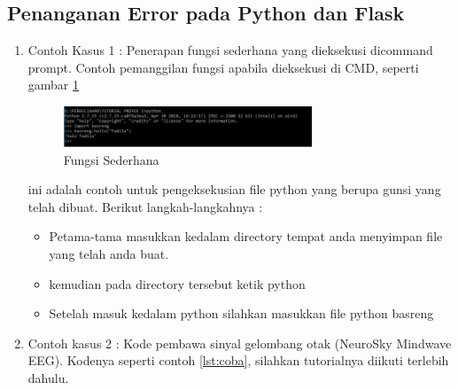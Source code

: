 \subsection{Penanganan Error pada Python dan Flask}
\begin{enumerate}
  \item Contoh Kasus 1 : Penerapan fungsi sederhana yang dieksekusi dicommand prompt. Contoh pemanggilan fungsi apabila dieksekusi di CMD, seperti gambar \ref{fig:contohsederhana}

  \begin{figure}[!ht]
        \centerline{\includegraphics[width=0.70\textwidth]{figures/10/contohsederhana.jpg}}
	    \caption{Fungsi Sederhana}
	    \label{fig:contohsederhana}
  \end{figure}


ini adalah contoh untuk pengeksekusian file python yang berupa gunsi yang telah dibuat. Berikut langkah-langkahnya :
    \begin{itemize}
        \item Petama-tama masukkan kedalam directory tempat anda menyimpan file yang telah anda buat.
        \item kemudian pada directory tersebut ketik python
        \item Setelah masuk kedalam python silahkan masukkan file python basreng
    \end{itemize}

  \item Contoh kasus 2 : Kode pembawa sinyal gelombang otak (NeuroSky Mindwave EEG). Kodenya seperti contoh \ref{lst:coba}, silahkan tutorialnya diikuti terlebih dahulu.

\end{enumerate}

